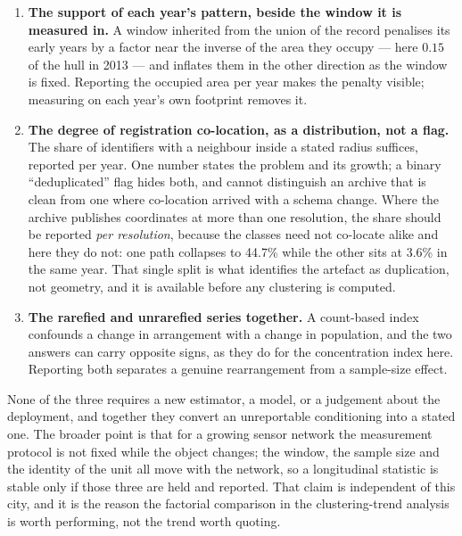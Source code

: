 \documentclass[fleqn,10pt,lineno]{wlpeerj}
\begin{document}
\begin{enumerate}
\item \textbf{The support of each year's pattern, beside the window it is measured in.} A window
inherited from the union of the record penalises its early years by a factor near the inverse of
the area they occupy --- here $0.15$ of the hull in 2013 --- and inflates them in the other
direction as the window is fixed. Reporting the occupied area per year makes the penalty visible;
measuring on each year's own footprint removes it.
\item \textbf{The degree of registration co-location, as a distribution, not a flag.} The
share of identifiers with a neighbour inside a stated radius suffices, reported per year. One
number states the problem and its growth; a binary ``deduplicated'' flag hides both, and cannot
distinguish an archive that is clean from one where co-location arrived with a schema change.
Where the archive publishes coordinates at more than one resolution, the share should be reported
\emph{per resolution}, because the classes need not co-locate alike and here they do not: one path
collapses to \num{44.7}\% while the other sits at \num{3.6}\% in the same year. That single
split is what identifies the artefact as duplication, not geometry, and it is available
before any clustering is computed.
\item \textbf{The rarefied and unrarefied series together.} A count-based index confounds a
change in arrangement with a change in population, and the two answers can carry opposite signs,
as they do for the concentration index here. Reporting both separates a genuine rearrangement
from a sample-size effect.
\end{enumerate}

None of the three requires a new estimator, a model, or a judgement about the deployment, and
together they convert an unreportable conditioning into a stated one. The broader point is that
for a growing sensor network the measurement protocol is not fixed while the object changes; the
window, the sample size and the identity of the unit all move with the network, so a longitudinal
statistic is stable only if those three are held and reported. That claim is independent of this
city, and it is the reason the factorial comparison in the clustering-trend analysis is worth
performing, not the trend worth quoting.
\end{document}
